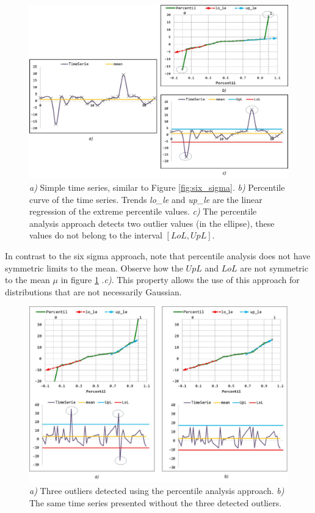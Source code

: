 \begin{figure}[h!]
  \vspace{0.5em} %
  \includegraphics[scale=0.5]{Figures/percentil_example.jpg}
  \caption{\textit{a)} Simple time series, similar to Figure \ref{fig:six_sigma}. \textit{b)} Percentile curve of the time series. Trends \textit{lo\_le} and \textit{up\_le} are the linear regression of the extreme percentile values.  \textit{c)}
The percentile analysis approach detects two outlier values (in the ellipse), these values do not belong to the interval  
$[LoL, UpL]$.}
  \label{fig:percentile}
\end{figure}

In contrast to the six sigma approach, note that percentile analysis does not have symmetric limits to the mean. Observe how the $UpL$ and $LoL$ are not symmetric to the mean $\mu$ in figure \ref{fig:percentile}{\color{red} .\textit{c)}}. This property allows the use of this approach for distributions that are not necessarily Gaussian.


\begin{figure}[h!]
  \vspace{0.5em} %
  \includegraphics[scale=0.5]{Figures/percentil_example_2.jpg}
  \caption{\textit{a)} Three outliers detected using the percentile analysis approach. \textit{b)} The same time series presented without the three detected outliers.}  
  \label{fig:percentile2}
\end{figure}

